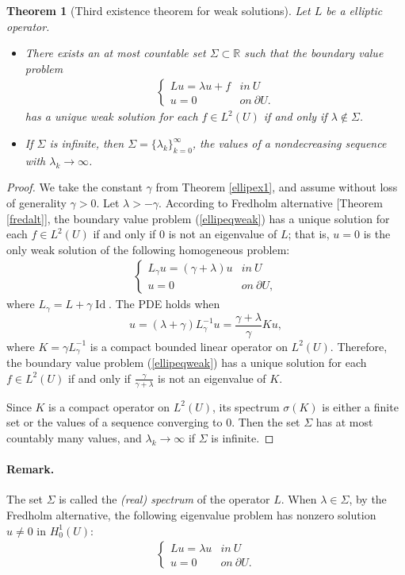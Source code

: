 \documentclass{article}
\numberwithin{equation}{section}
\newcommand{\bbR}{\mathbb{R}}
\DeclareMathOperator{\id}{Id}
\theoremstyle{plain}
\newtheorem{theorem}{Theorem}[section]
\theoremstyle{definition}
\begin{document}
\begin{theorem}[Third existence theorem for weak solutions]\label{ellipex3}
Let $L$ be a elliptic operator.
\begin{itemize}
\item[(i)] There exists an at most countable set $\Sigma\subset\bbR$ such that the boundary value problem
\begin{align}
\begin{cases}
	Lu=\lambda u+f & in\ U\\
	u=0 & on\ \partial U.
\end{cases}\label{ellipeqweak}
\end{align}
has a unique weak solution for each $f\in L^2(U)$ if and only if $\lambda\notin\Sigma$.
\item[(ii)] If $\Sigma$ is infinite, then $\Sigma=\{\lambda_k\}_{k=0}^\infty$, the values of a nondecreasing sequence with $\lambda_k\to\infty$.
\end{itemize}
\end{theorem}
\begin{proof}
We take the constant $\gamma$ from Theorem \ref{ellipex1}, and assume without loss of generality $\gamma>0$. Let $\lambda>-\gamma$. According to Fredholm alternative [Theorem \ref{fredalt}], the boundary value problem (\ref{ellipeqweak}) has a unique solution for each $f\in L^2(U)$ if and only if $0$ is not an eigenvalue of $L$; that is, $u=0$ is the only weak solution of the following homogeneous problem:
\begin{align*}
	\begin{cases}
		L_\gamma u=(\gamma+\lambda)u & in\ U\\
		u=0 & on\ \partial U,
	\end{cases}
\end{align*}
where $L_\gamma=L+\gamma\id$. The PDE holds when $$u=(\lambda+\gamma)L_\gamma^{-1}u=\frac{\gamma+\lambda}{\gamma}Ku,$$ where $K=\gamma L_\gamma^{-1}$ is a compact bounded linear operator on $L^2(U)$. Therefore, the boundary value problem (\ref{ellipeqweak}) has a unique solution for each $f\in L^2(U)$ if and only if $\frac{\gamma}{\gamma+\lambda}$ is not an eigenvalue of $K$.

Since $K$ is a compact operator on $L^2(U)$, its spectrum $\sigma(K)$ is either a finite set or the values of a sequence converging to $0$. Then the set $\Sigma$ has at most countably many values, and $\lambda_k\to\infty$ if $\Sigma$ is infinite.
\end{proof}

\paragraph{Remark.} The set $\Sigma$ is called the \textit{(real) spectrum} of the operator $L$. When $\lambda\in\Sigma$, by the Fredholm alternative, the following eigenvalue problem has nonzero solution $u\neq 0$ in $H_0^1(U)$:
\begin{align*}
	\begin{cases}
		Lu=\lambda u & in\ U\\
		u=0 & on\ \partial U.
	\end{cases}
\end{align*}
\end{document}

